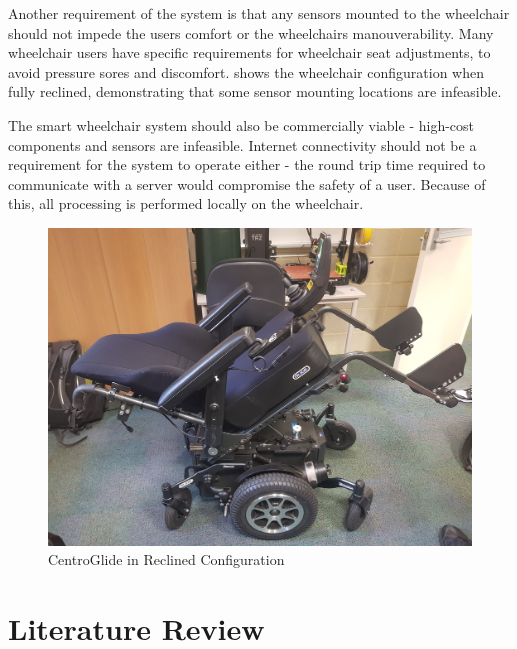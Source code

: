 \documentclass[12pt]{article}
\begin{document}
Another requirement of the system is that any sensors mounted to the wheelchair
should not impede the users comfort or the wheelchairs manouverability.
Many wheelchair users have specific requirements for wheelchair seat adjustments,
to avoid pressure sores and discomfort.  shows the
wheelchair configuration when fully reclined, demonstrating that some sensor mounting locations
are infeasible.

The smart wheelchair system should also be commercially viable - high-cost
components and sensors are infeasible. Internet connectivity should not be a requirement
for the system to operate either - the round trip time required to communicate with a server
would compromise the safety of a user. Because of this, all processing is performed locally
on the wheelchair.

\begin{figure}
    \centering
    \includegraphics[width=0.8\linewidth]{images/wheelchair_reclined.jpeg}
    \caption{CentroGlide in Reclined Configuration}
    \label{fig:wheelchair_reclined}
\end{figure}
\pagebreak

\section{Literature Review}
\end{document}
